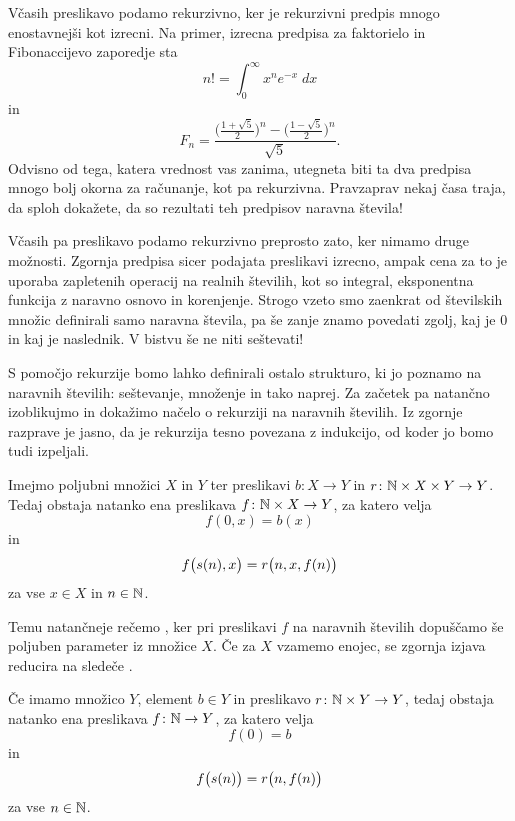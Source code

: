 Včasih preslikavo podamo rekurzivno, ker je rekurzivni predpis mnogo enostavnejši kot izrecni. Na primer, izrecna predpisa za faktorielo in Fibonaccijevo zaporedje sta
\[n! = \int_0^\infty x^n e^{-x} \; dx\]
in
\[F_n = \frac{\Big(\frac{1+\sqrt{5}}{2}\Big)^n - \Big(\frac{1-\sqrt{5}}{2}\Big)^n}{\sqrt{5}}.\]
Odvisno od tega, katera vrednost vas zanima, utegneta biti ta dva predpisa mnogo bolj okorna za računanje, kot pa rekurzivna. Pravzaprav nekaj časa traja, da sploh dokažete, da so rezultati teh predpisov naravna števila!

Včasih pa preslikavo podamo rekurzivno preprosto zato, ker nimamo druge možnosti. Zgornja predpisa sicer podajata preslikavi izrecno, ampak cena za to je uporaba zapletenih operacij na realnih številih, kot so integral, eksponentna funkcija z naravno osnovo in korenjenje. Strogo vzeto smo zaenkrat od številskih množic definirali samo naravna števila, pa še zanje znamo povedati zgolj, kaj je $0$ in kaj je naslednik. V bistvu še ne  niti seštevati!

S pomočjo rekurzije bomo lahko definirali ostalo strukturo, ki jo poznamo na naravnih številih: seštevanje, množenje in tako naprej. Za začetek pa natančno izoblikujmo in dokažimo načelo o rekurziji na naravnih številih. Iz zgornje razprave je jasno, da je rekurzija tesno povezana z indukcijo, od koder jo bomo tudi izpeljali.

\begin{izrek}
Imejmo poljubni množici $X$ in $Y$ ter preslikavi $b\colon X \to Y$ in $r\colon \mathbb{N} \times X \times Y \to Y$. Tedaj obstaja natanko ena preslikava $f\colon \mathbb{N} \times X \to Y$, za katero velja
\[f(0, x) = b(x)\]
in
\[f\big(\suc[n], x\big) = r\big(n, x, f(n)\big)\]
za vse $x \in X$ in $n \in \mathbb{N}$.

Temu natančneje rečemo , ker pri preslikavi $f$ na naravnih številih dopuščamo še poljuben parameter iz množice $X$. Če za $X$ vzamemo enojec, se zgornja izjava reducira na sledeče .

Če imamo množico $Y$, element $b \in Y$ in preslikavo $r\colon \mathbb{N} \times Y \to Y$, tedaj obstaja natanko ena preslikava $f\colon \mathbb{N} \to Y$, za katero velja
\[f(0) = b\]
in
\[f\big(\suc[n]\big) = r\big(n, f(n)\big)\]
za vse $n \in \mathbb{N}$.
\end{izrek}

\begin{dokaz}
\end{dokaz}

